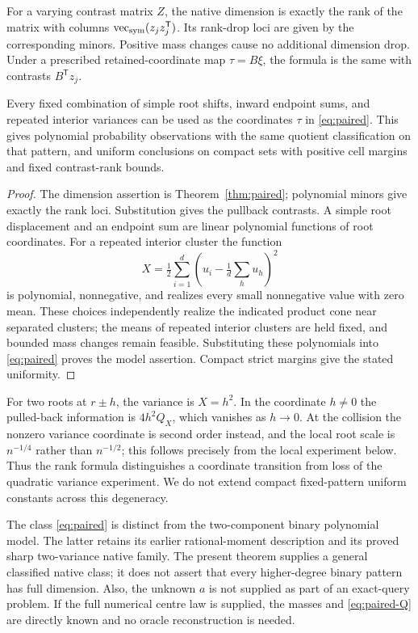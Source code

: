 \begin{corollary}\label{cor:rank-loci}
For a varying contrast matrix $Z$, the native dimension is exactly the rank of the matrix with columns $\operatorname{vec}_{\rm sym}(z_jz_j^{\mathsf T})$. Its rank-drop loci are given by the corresponding minors. Positive mass changes cause no additional dimension drop. Under a prescribed retained-coordinate map $\tau=B\xi$, the formula is the same with contrasts $B^{\mathsf T}z_j$.

Every fixed combination of simple root shifts, inward endpoint sums, and repeated interior variances can be used as the coordinates $\tau$ in \eqref{eq:paired}. This gives polynomial probability observations with the same quotient classification on that pattern, and uniform conclusions on compact sets with positive cell margins and fixed contrast-rank bounds.
\end{corollary}
\begin{proof}
The dimension assertion is Theorem~\ref{thm:paired}; polynomial minors give exactly the rank loci. Substitution gives the pullback contrasts. A simple root displacement and an endpoint sum are linear polynomial functions of root coordinates. For a repeated interior cluster the function
\[
 X=\tfrac12\sum_{i=1}^d\left(u_i-\tfrac1d\sum_hu_h\right)^2
\]
is polynomial, nonnegative, and realizes every small nonnegative value with zero mean. These choices independently realize the indicated product cone near separated clusters; the means of repeated interior clusters are held fixed, and bounded mass changes remain feasible. Substituting these polynomials into \eqref{eq:paired} proves the model assertion. Compact strict margins give the stated uniformity.
\end{proof}
For two roots at $r\pm h$, the variance is $X=h^2$. In the coordinate $h\ne0$ the pulled-back information is $4h^2Q_X$, which vanishes as $h\to0$. At the collision the nonzero variance coordinate is second order instead, and the local root scale is $n^{-1/4}$ rather than $n^{-1/2}$; this follows precisely from the local experiment below. Thus the rank formula distinguishes a coordinate transition from loss of the quadratic variance experiment. We do not extend compact fixed-pattern uniform constants across this degeneracy.

The class \eqref{eq:paired} is distinct from the two-component binary polynomial model. The latter retains its earlier rational-moment description and its proved sharp two-variance native family. The present theorem supplies a general classified native class; it does not assert that every higher-degree binary pattern has full dimension. Also, the unknown $a$ is not supplied as part of an exact-query problem. If the full numerical centre law is supplied, the masses and \eqref{eq:paired-Q} are directly known and no oracle reconstruction is needed.

